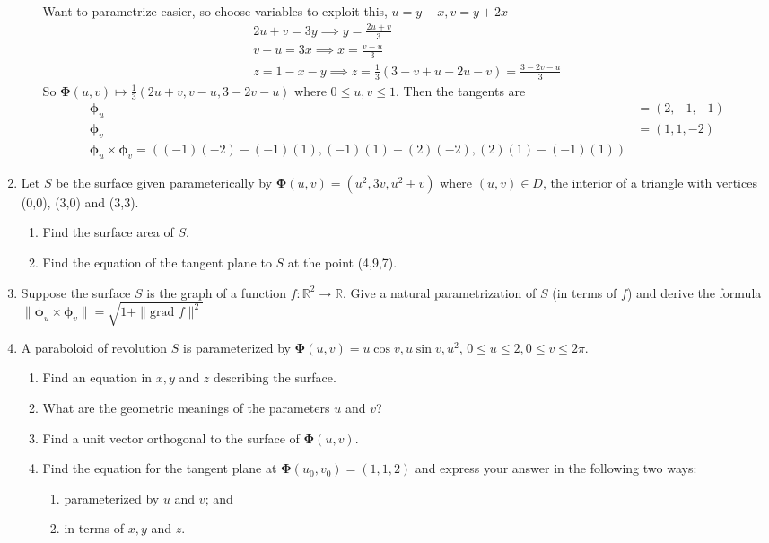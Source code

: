 \documentclass{article}
\newcommand{\norm}[1]{\| #1 \|}
\begin{document}
\begin{enumerate}
\begin{enumerate}
        Want to parametrize easier, so choose variables to exploit this, $u = y - x, v = y + 2x$
        \begin{align*}
            2u + v = 3y \implies y = \frac{2u + v}{3} \\
            v - u = 3x \implies x = \frac{v - u}{3} \\
            z = 1 - x - y \implies z = \frac{1}{3}(3 -v + u -2u -v) = \frac{3 -2v -u}{3}
        \end{align*}
        So $\boldsymbol \Phi(u,v) \mapsto \frac{1}{3}(2u + v, v - u, 3 - 2v -u)$ where $0 \leq u , v \leq 1$.
        Then the tangents are
        \begin{align*}
            \boldsymbol \phi_u &= (2, -1, -1) \\
            \boldsymbol \phi_v &= (1,1,-2) \\
            \boldsymbol \phi_u \times \boldsymbol \phi_v = ((-1)(-2) - (-1)(1), (-1)(1) - (2)(-2), (2)(1) - (-1)(1))
        \end{align*}
    \end{enumerate}
    \newpage
    \item Let $S$ be the surface given parameterically by $\boldsymbol \Phi (u,v) = (u^2, 3v, u^2 + v)$ where $(u,v) \in D$, the interior of a triangle with vertices (0,0), (3,0) and (3,3).
    \begin{enumerate}
        \item Find the surface area of $S$.
        \item Find the equation of the tangent plane to $S$ at the point (4,9,7).
    \end{enumerate}
    \newpage    
    \item Suppose the surface $S$ is the graph of a function $f : \mathbb{R}^2 \rightarrow \mathbb{R}$. Give a natural parametrization of $S$ (in terms of $f$) and derive the formula $\norm{\boldsymbol \phi_u \times \boldsymbol \phi_v} = \sqrt{1 + \norm{\text{grad }f}^2}$
    \newpage
    \item A paraboloid of revolution $S$ is parameterized by $\boldsymbol \Phi (u,v) = u \cos v, u \sin v, u^2$, $0 \leq u \leq 2, 0 \leq v \leq 2\pi$.
    \begin{enumerate}
        \item Find an equation in $x,y$ and $z$ describing the surface.
        \item What are the geometric meanings of the parameters $u$ and $v$?
        \item Find a unit vector orthogonal to the surface of $\boldsymbol \Phi (u,v)$.
        \item Find the equation for the tangent plane at $\boldsymbol \Phi(u_0,v_0) = (1,1,2)$ and express your answer in the following two ways:
        \begin{enumerate}
            \item parameterized by $u$ and $v$; and
            \item in terms of $x,y$ and $z$.
        \end{enumerate}


\end{enumerate}
\end{enumerate}
\end{document}
